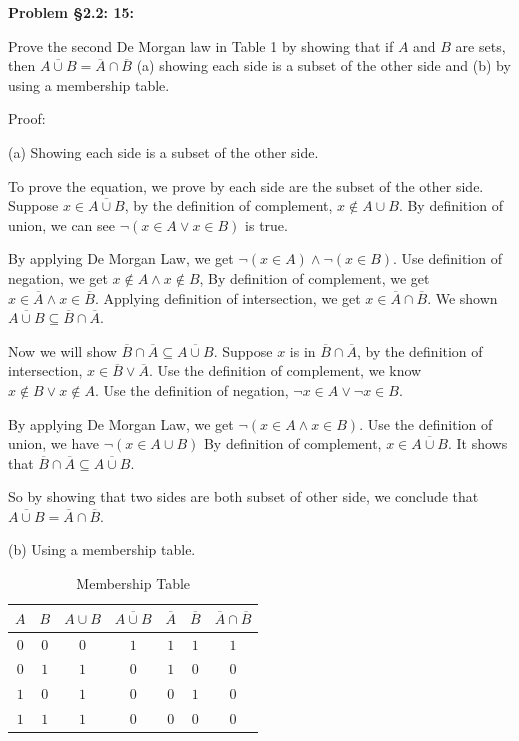 \documentclass{article}
\newenvironment{problem}[1]
{\begin{mdframed}[default]
\textbf{Problem #1:}
}
{\end{mdframed}
}
\begin{document}
\begin{problem}{\S 2.2: 15}
Prove the second De Morgan law in Table 1 by showing that if $A$ and $B$ are sets,
then $\overline{A \cup B} = \overline{A} \cap \overline{B}$ (a) showing each side
is a subset of the other side and (b) by using a membership table.\newline

Proof:

\item[(a)] Showing each side is a subset of the other side.

To prove the equation, we prove by each side are the subset of the other side.
Suppose $x \in \overline{A \cup B}$, by the definition of complement, $x \notin A \cup B$.
By definition of union, we can see $\neg(x \in A \lor x \in B)$ is true.

By applying De Morgan Law, we get $\neg(x \in A) \land \neg(x \in B)$. 
Use definition of negation, we get $x \notin A \land x \notin B$,
By definition of complement, we get $x \in \overline{A} \land x \in \overline{B}$.
Applying definition of intersection, we get $x \in \overline{A} \cap \overline{B}$.
We shown $\overline{A\cup B}\subseteq \overline{B}\cap\overline{A}$.

Now we will show $\overline{B}\cap\overline{A}\subseteq \overline{A\cup B}$.
Suppose $x$ is in $\overline{B}\cap\overline{A}$, by the definition of intersection, $x \in \overline{B} \lor \overline{A} $.
Use the definition of complement, we know $x \notin B \lor x \notin A$.
Use the definition of negation, $\neg x \in A \lor \neg x \in B$.

By applying De Morgan Law, we get $\neg(x \in A \land x \in B)$.
Use the definition of union, we have $\neg(x \in A \cup B)$
By definition of complement, $x \in \overline{A \cup B}$. It shows that $\overline{B}\cap\overline{A}\subseteq \overline{A\cup B}$.

So by showing that two sides are both subset of other side, we conclude that  $\overline{A \cup B} = \overline{A} \cap \overline{B}$.\newline

\item[(b)] Using a membership table.
\end{problem}
\begin{table}[h]
    \centering
    \caption{Membership Table}
    \label{table1}
    \begin{tabular}{c|c|c|c|c|c|c}
    
      $A$ & $B$ & $A \cup B$ & $\overline{A \cup B}$ & $\overline{A}$ & $\overline{B}$ & $\overline{A} \cap \overline{B}$\\
      \hline
      $0$&$0$&$0$&$1$&$1$&$1$&$1$\\
      \hline
      $0$&$1$&$1$&$0$&$1$&$0$&$0$\\
      \hline
      $1$&$0$&$1$&$0$&$0$&$1$&$0$\\
      \hline
      $1$&$1$&$1$&$0$&$0$&$0$&$0$\\
    \hline
    \end{tabular}
    
    \end{table}
\end{document}
